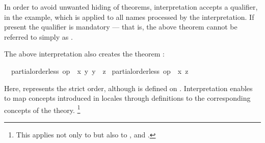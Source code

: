 \begin{isabellebody}
\begin{isamarkuptext}
  In order to avoid unwanted hiding of theorems, interpretation
  accepts a qualifier,  in the example, which is applied to
  all names processed by the
  interpretation.  If present the qualifier is mandatory --- that is,
  the above theorem cannot be referred to simply as .%
\end{isamarkuptext}%
\isamarkuptrue%
%
\isamarkuptrue%
%
\begin{isamarkuptext}%
The above interpretation also creates the theorem
  : \begin{isabelle}%
\ \ {\isasymlbrakk}partial{\isacharunderscore}order{\isachardot}less\ op\ {\isasymle}\ {\isacharquery}x\ {\isacharquery}y{\isacharsemicolon}\ {\isacharquery}y\ {\isasymle}\ {\isacharquery}z{\isasymrbrakk}\isanewline
\isaindent{\ \ }{\isasymLongrightarrow}\ partial{\isacharunderscore}order{\isachardot}less\ op\ {\isasymle}\ {\isacharquery}x\ {\isacharquery}z%
\end{isabelle}
  Here, 
  represents the strict order, although \isa{{\isacharless}} is defined on
  .  Interpretation enables to map concepts
  introduced in locales through definitions to the corresponding
  concepts of the theory.%
\footnote{This applies not only to  but also to
  ,  and .}%
\end{isamarkuptext}%
\isamarkuptrue%
%
\isadelimtheory
%
\endisadelimtheory
%
\isatagtheory
%
\endisatagtheory
{\isafoldtheory}%
%
\isadelimtheory
%
\endisadelimtheory
\end{isabellebody}%
